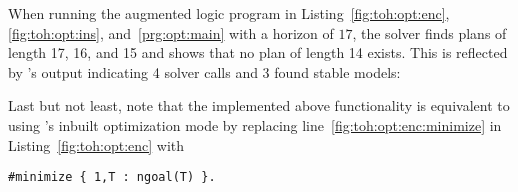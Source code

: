 When running the augmented logic program in Listing~\ref{fig:toh:opt:enc}, \ref{fig:toh:opt:ins}, and~\ref{prg:opt:main} with a horizon of $17$,
the solver finds plans of length 17, 16, and 15 and shows that no plan of length 14 exists.
This is reflected by \clingo's output indicating 4 solver calls and 3 found stable models:
%


Last but not least,
note that the implemented above functionality is equivalent to using \clingo's inbuilt optimization mode by replacing line~\ref{fig:toh:opt:enc:minimize} in Listing~\ref{fig:toh:opt:enc} with
\begin{lstlisting}[language=clingo,firstnumber=23]
#minimize { 1,T : ngoal(T) }.
\end{lstlisting}

